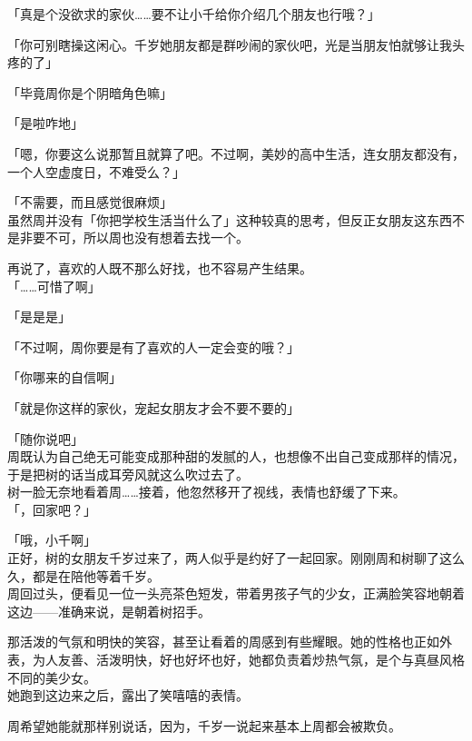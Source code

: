 「真是个没欲求的家伙……要不让小千给你介绍几个朋友也行哦？」

「你可别瞎操这闲心。千岁她朋友都是群吵闹的家伙吧，光是当朋友怕就够让我头疼的了」

「毕竟周你是个阴暗角色嘛」

「是啦咋地」

「嗯，你要这么说那暂且就算了吧。不过啊，美妙的高中生活，连女朋友都没有，一个人空虚度日，不难受么？」

「不需要，而且感觉很麻烦」\\

虽然周并没有「你把学校生活当什么了」这种较真的思考，但反正女朋友这东西不是非要不可，所以周也没有想着去找一个。

再说了，喜欢的人既不那么好找，也不容易产生结果。\\

「……可惜了啊」

「是是是」

「不过啊，周你要是有了喜欢的人一定会变的哦？」

「你哪来的自信啊」

「就是你这样的家伙，宠起女朋友才会不要不要的」

「随你说吧」\\

周既认为自己绝无可能变成那种甜的发腻的人，也想像不出自己变成那样的情况，于是把树的话当成耳旁风就这么吹过去了。\\

树一脸无奈地看着周……接着，他忽然移开了视线，表情也舒缓了下来。\\

「，回家吧？」

「哦，小千啊」\\

正好，树的女朋友千岁过来了，两人似乎是约好了一起回家。刚刚周和树聊了这么久，都是在陪他等着千岁。\\

周回过头，便看见一位一头亮茶色短发，带着男孩子气的少女，正满脸笑容地朝着这边——准确来说，是朝着树招手。

那活泼的气氛和明快的笑容，甚至让看着的周感到有些耀眼。她的性格也正如外表，为人友善、活泼明快，好也好坏也好，她都负责着炒热气氛，是个与真昼风格不同的美少女。\\

她跑到这边来之后，露出了笑嘻嘻的表情。

周希望她能就那样别说话，因为，千岁一说起来基本上周都会被欺负。\\

